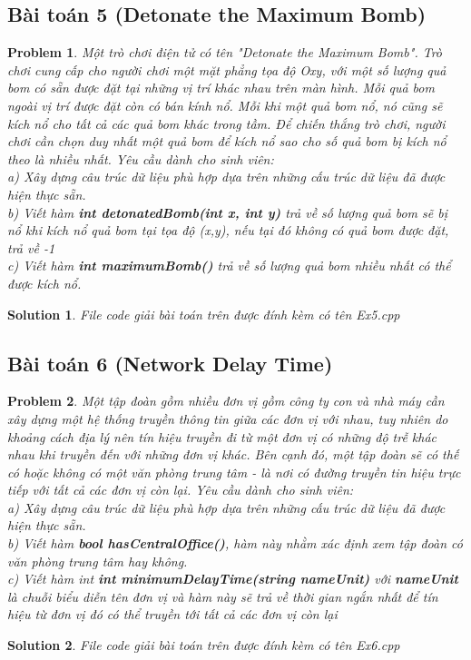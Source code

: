 \documentclass[a4paper]{article}
\newtheorem*{problem}{Problem}
\newtheorem*{sol}{Solution}
\begin{document}
    \subsection{Bài toán 5 (Detonate the Maximum Bomb)}
    \begin{problem}
Một trò chơi điện tử có tên "Detonate the Maximum Bomb". Trò chơi cung cấp cho người chơi một mặt phẳng tọa độ Oxy, với một số lượng quả bom có sẵn được đặt tại những vị trí khác nhau trên màn hình. Mỗi quả bom ngoài vị trí được đặt còn có bán kính nổ. Mỗi khi một quả bom nổ, nó cũng sẽ kích nổ cho tất cả các quả bom khác trong tầm. Để chiến thắng trò chơi, người chơi cần chọn duy nhất một quả bom để kích nổ sao cho số quả bom bị kích nổ theo là nhiều nhất. Yêu cầu dành cho sinh viên: \\
a) Xây dựng câu trúc dữ liệu phù hợp dựa trên những cấu trúc dữ liệu đã được hiện thực sẵn.\\
b) Viết hàm \textbf{int detonatedBomb(int x, int y)} trả về số lượng quả bom sẽ bị nổ khi kích nổ quả bom tại tọa độ (x,y), nếu tại đó không có quả bom được đặt, trả về -1  \\
c) Viết hàm \textbf{int maximumBomb()} trả về số lượng quả bom nhiều nhất có thể được kích nổ.
    \end{problem}
    \begin{sol}
        File code giải bài toán trên được đính kèm có tên Ex5.cpp
    \end{sol}

    \subsection{Bài toán 6 (Network Delay Time)}
    \begin{problem}
Một tập đoàn gồm nhiều đơn vị gồm công ty con và nhà máy cần xây dựng một hệ thống truyền thông tin giữa các đơn vị với nhau, tuy nhiên do khoảng cách địa lý nên tín hiệu truyền đi từ một đơn vị có những độ trễ khác nhau khi truyền đến với những đơn vị khác. Bên cạnh đó, một tập đoàn sẽ có thế có hoặc không có một văn phòng trung tâm - là nơi có đường truyền tin hiệu trực tiếp với tất cả các đơn vị còn lại. Yêu cầu dành cho sinh viên: \\
a) Xây dựng câu trúc dữ liệu phù hợp dựa trên những cấu trúc dữ liệu đã được hiện thực sẵn.\\
b) Viết hàm \textbf{ bool hasCentralOffice()}, hàm này nhằm xác định xem tập đoàn có văn phòng trung tâm hay không.\\
c) Viết hàm int \textbf{int minimumDelayTime(string nameUnit)} với \textbf{nameUnit} là chuỗi biểu diễn tên đơn vị và hàm này sẽ trả về thời gian ngắn nhất để tín hiệu từ đơn vị đó có thể truyền tới tất cả các đơn vị còn lại        
    \end{problem}
    \begin{sol}
       File code giải bài toán trên được đính kèm có tên Ex6.cpp 
    \end{sol}
\end{document}

